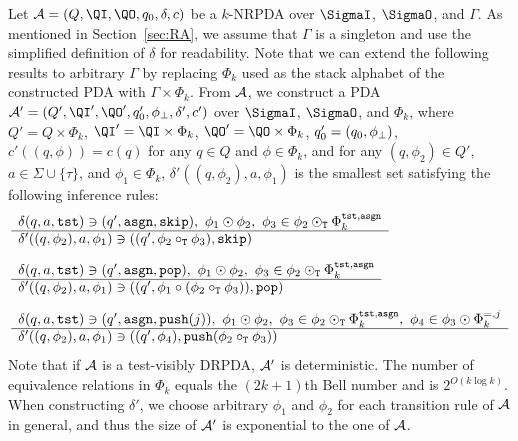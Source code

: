 Let $\calA=(Q,\QI,\QO,q_0,\delta,c)$ be a $k$-NRPDA
over $\SigmaI$, $\SigmaO$, and $\Gamma$.
As mentioned in Section~\ref{sec:RA},
we assume that $\Gamma$ is a singleton and
use the simplified definition of $\delta$ for readability.
Note that we can extend the following results to arbitrary $\Gamma$
by replacing $\Phi_k$ used as the stack alphabet of
the constructed PDA with $\Gamma\times\Phi_k$.
%
From ${\cal A}$, we construct a PDA
$\calA'=(Q',\QI',\QO',q'_0,\phizero,\delta',c')$
over $\SigmaI$, $\SigmaO$, and $\Phi_k$,
where $Q'=Q\times\Phi_k$, $\QI'=\QI\times\Phi_k$, $\QO'=\QO\times\Phi_k$,
$q'_0=(q_0,\phi_{\bot})$,
$c'((q,\phi))=c(q)$ for any $q\in Q$ and $\phi\in\Phi_k$,
and for any $(q,\phi_2)\in Q'$, $a\in\Sigma\cup\{\tau\}$,
and $\phi_1\in\Phi_k$,
$\delta'((q,\phi_2),a,\phi_1)$ is the smallest set
satisfying the following inference rules:
%
\begin{align}
&
\begin{array}{l}
  \delta(q,a,\tst) \ni (q',\asgn,\skip), \
  \phi_1\COMPBL\phi_2, \
  \phi_3\in \phi_2\COMPBLT\Phi_k^{\tst,\asgn}
  \\ \hline
  \delta'((q,\phi_2),a,\phi_1) \ni ((q',\phi_2\COMPT\phi_3),\skip)
\end{array}\label{eq: PDAtoRPDA1}
%
\\[\medskipamount]
&
\begin{array}{l}
  \delta(q,a,\tst) \ni (q',\asgn,\pop), \
  \phi_1\COMPBL\phi_2, \
  \phi_3\in \phi_2\COMPBLT\Phi_k^{\tst,\asgn}
  \\ \hline
  \delta'((q,\phi_2),a,\phi_1) \ni ((q',\phi_1\COMP(\phi_2\COMPT\phi_3)),\pop)
\end{array}\label{eq: PDAtoRPDA2}
%
\\[\medskipamount]
&
\begin{array}{l}
  \delta(q,a,\tst) \ni (q',\asgn,\push(j)), \
  \phi_1\COMPBL\phi_2, \
  \phi_3\in \phi_2\COMPBLT\Phi_k^{\tst,\asgn}, \
  \phi_4\in \phi_3\COMPBL\Phi_k^{=,j}
  \\ \hline
  \delta'((q,\phi_2),a,\phi_1) \ni ((q',\phi_4),\push(\phi_2\COMPT\phi_3))
\end{array}\label{eq: PDAtoRPDA3}
%
\end{align}
Note that if ${\cal A}$ is a test-visibly DRPDA,
${\cal A}'$ is deterministic.
The number of equivalence relations in $\Phi_k$ equals
the $(2k+1)$th Bell number
and is $2^{O(k\log k)}$.
When constructing $\delta'$,
we choose arbitrary $\phi_1$ and $\phi_2$ for each transition rule of
${\cal A}$ in general,
and thus the size of ${\cal A}'$ is exponential to the one of ${\cal A}$.

